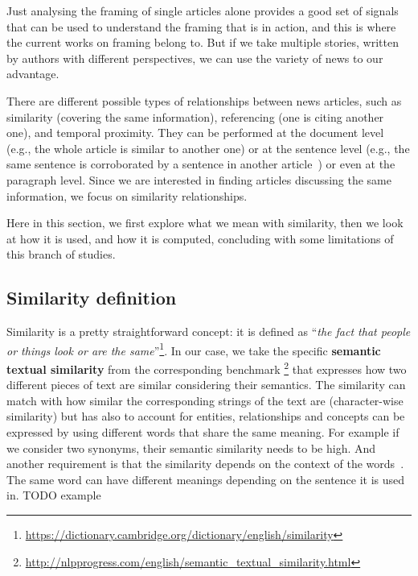 Just analysing the framing of single articles alone provides a good set of signals that can be used to understand the framing that is in action, and this is where the current works on framing belong to. But if we take multiple stories, written by authors with different perspectives, we can use the variety of news to our advantage.


There are different possible types of relationships between news articles, such as similarity (covering the same information), referencing (one is citing another one), and temporal proximity. They can be performed at the document level (e.g., the whole article is similar to another one) or at the sentence level (e.g., the same sentence is corroborated by a sentence in another article~\cite{bountouridis2018explaining}) or even at the paragraph level.
Since we are interested in finding articles discussing the same information, we focus on similarity relationships.

Here in this section, we first explore what we mean with similarity, then we look at how it is used, and how it is computed, concluding with some limitations of this branch of studies.

\subsection{Similarity definition}

Similarity is a pretty straightforward concept: it is defined as ``\emph{the fact that people or things look or are the same}''\footnote{\url{https://dictionary.cambridge.org/dictionary/english/similarity}}. In our case, we take the specific \textbf{semantic textual similarity} from the corresponding benchmark \footnote{\url{http://nlpprogress.com/english/semantic\_textual\_similarity.html}} that expresses how two different pieces of text are similar considering their semantics.
The similarity can match with how similar the corresponding strings of the text are (character-wise similarity) but has also to account for entities, relationships and concepts can be expressed by using different words that share the same meaning.
For example if we consider two synonyms, their semantic similarity needs to be high. 
And another requirement is that the similarity depends on the context of the words~\cite{miller1991contextual}. The same word can have different meanings depending on the sentence it is used in.
TODO example

